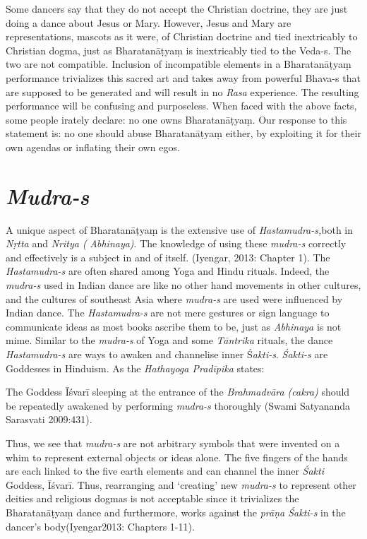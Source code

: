 Some dancers say that they do not accept the Christian doctrine, they are just doing a dance about Jesus or Mary. However, Jesus and Mary are representations, mascots as it were, of Christian doctrine and tied inextricably to Christian dogma, just as Bharatanāṭyaṃ is inextricably tied to the Veda-s. The two are not compatible. Inclusion of incompatible elements in a Bharatanāṭyaṃ performance trivializes this sacred art and takes away from powerful Bhava-s that are supposed to be generated and will result in no \textit{Rasa} experience. The resulting performance will be confusing and purposeless. When faced with the above facts, some people irately declare: no one owns Bharatanāṭyaṃ. Our response to this statement is: no one should abuse Bharatanāṭyaṃ either, by exploiting it for their own agendas or inflating their own egos.


\section*{\textit{Mudra-s}}

A unique aspect of Bharatanāṭyaṃ is the extensive use of \textit{Hastamudra-s,}\break both in \textit{Nṛtta }and \textit{Nritya (} \textit{Abhinaya)}. The knowledge of using these \textit{mudra-s }correctly and effectively is a subject in and of itself. (Iyengar, 2013: Chapter 1). The \textit{Hastamudra-s} are often shared among Yoga and Hindu rituals. Indeed, the \textit{mudra-s} used in Indian dance are like no other hand movements in other cultures, and the cultures of southeast Asia where \textit{mudra-s }are used were influenced by Indian dance. The \textit{Hastamudra-s }are not mere gestures or sign language to communicate ideas as most books ascribe them to be, just as \textit{Abhinaya }is not mime. Similar to the \textit{mudra-s }of Yoga and some \textit{Tāntrika} rituals, the dance \textit{Hastamudra-s} are ways to awaken and channelise inner Ś\textit{akti-s}. \textit{Śakti-s} are Goddesses in Hinduism. As the \textit{Hathayoga Pradīpika} states:

The Goddess Īśvarī sleeping at the entrance of the \textit{Brahmadvāra (cakra)} should be repeatedly awakened by performing \textit{mudra-s} thoroughly (Swami Satyananda Sarasvati 2009:431).

Thus, we see that \textit{mudra-s }are not arbitrary symbols that were invented on a whim to represent external objects or ideas alone. The five fingers of the hands are each linked to the five earth elements and can channel the inner \textit{Śakti} Goddess, Īśvarī. Thus, rearranging and ‘creating’ new \textit{mudra-s }to represent other deities and religious dogmas is not acceptable since it trivializes the Bharatanāṭyaṃ dance and furthermore, works against the \textit{prāṇa Śakti-s} in the dancer’s body(Iyengar2013: Chapters 1-11).

